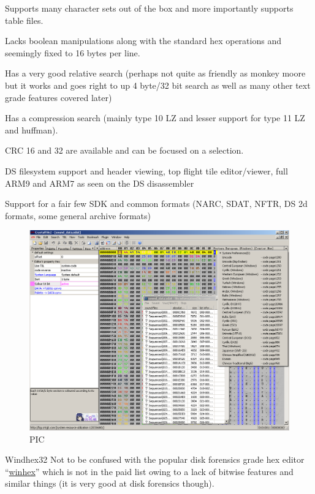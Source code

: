 \documentclass[
]{book}
\begin{document}
Supports many character sets out of the box and more importantly supports table files.

Lacks boolean manipulations along with the standard hex operations and seemingly fixed to 16 bytes per line.

Has a very good relative search (perhaps not quite as friendly as monkey moore but it works and goes right to up 4 byte/32 bit search as well as many other text grade features covered later)

Has a compression search (mainly type 10 LZ and lesser support for type 11 LZ and huffman).

CRC 16 and 32 are available and can be focused on a selection.

DS filesystem support and header viewing, top flight tile editor/viewer, full ARM9 and ARM7 as seen on the DS disassembler

Support for a fair few SDK and common formats (NARC, SDAT, NFTR, DS 2d formats, some general archive formats)

\begin{figure}
\centering
\includegraphics{images/7_home_fast6191_romhackingguide_unrenamed_files___ackingguidehexeditorsshowcasecrystaltile2_1.png}
\caption{PIC}
\end{figure}

Windhex32 Not to be confused with the popular disk forensics grade hex editor ``\href{https://www.x-ways.net/winhex/}{winhex}'' which is not in the paid list owing to a lack of bitwise features and similar things (it is very good at disk forensics though).
\end{document}
